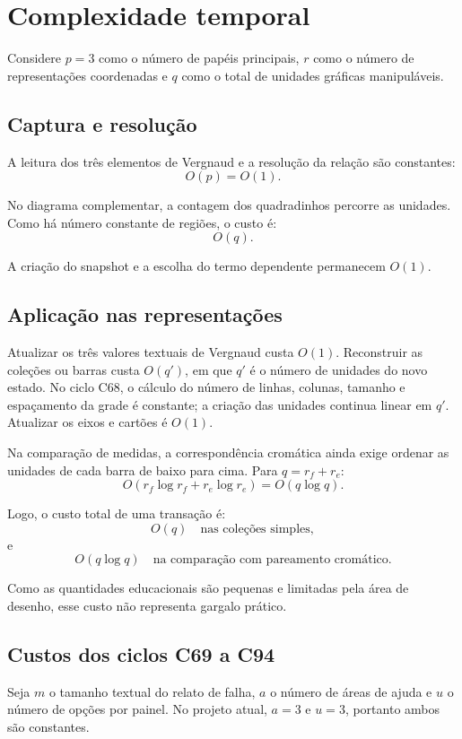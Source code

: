 \documentclass[12pt,a4paper]{article}
\begin{document}
\section{Complexidade temporal}

Considere $p=3$ como o número de papéis principais, $r$ como o número de representações coordenadas e $q$ como o total de unidades gráficas manipuláveis.

\subsection{Captura e resolução}

A leitura dos três elementos de Vergnaud e a resolução da relação são constantes:
\[
O(p)=O(1).
\]

No diagrama complementar, a contagem dos quadradinhos percorre as unidades. Como há número constante de regiões, o custo é:
\[
O(q).
\]

A criação do snapshot e a escolha do termo dependente permanecem $O(1)$.

\subsection{Aplicação nas representações}

Atualizar os três valores textuais de Vergnaud custa $O(1)$. Reconstruir as coleções ou barras custa $O(q')$, em que $q'$ é o número de unidades do novo estado. No ciclo C68, o cálculo do número de linhas, colunas, tamanho e espaçamento da grade é constante; a criação das unidades continua linear em $q'$. Atualizar os eixos e cartões é $O(1)$.

Na comparação de medidas, a correspondência cromática ainda exige ordenar as unidades de cada barra de baixo para cima. Para $q=r_f+r_e$:
\[
O(r_f\log r_f+r_e\log r_e)=O(q\log q).
\]

Logo, o custo total de uma transação é:
\[
O(q) \quad \text{nas coleções simples},
\]
e
\[
O(q\log q) \quad \text{na comparação com pareamento cromático}.
\]

Como as quantidades educacionais são pequenas e limitadas pela área de desenho, esse custo não representa gargalo prático.

\subsection{Custos dos ciclos C69 a C94}
Seja $m$ o tamanho textual do relato de falha, $a$ o número de áreas de ajuda e $u$ o número de opções por painel. No projeto atual, $a=3$ e $u=3$, portanto ambos são constantes.
\end{document}
